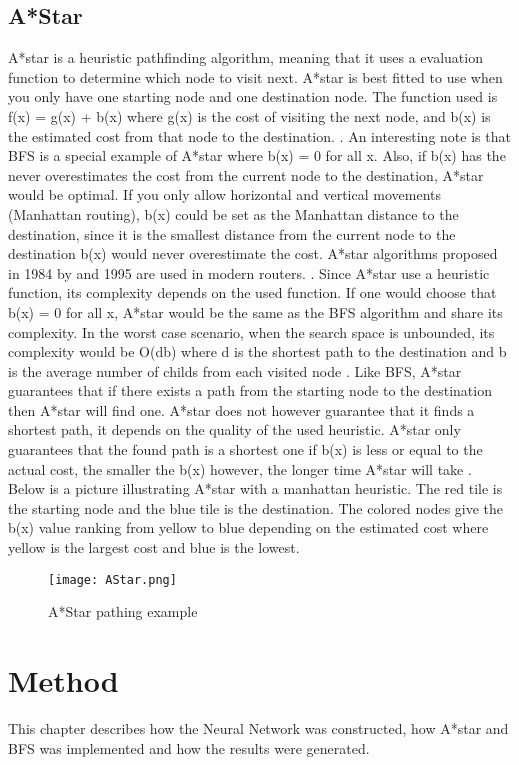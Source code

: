 \documentclass{kththesis}
\begin{document}
\section{A*Star}
A*star is a heuristic pathfinding algorithm, meaning that it uses a evaluation function to determine which node to visit next. A*star is best fitted to use when you only have one starting node and one destination node. The function used is f(x) = g(x) + b(x) where g(x) is the cost of visiting the next node, and b(x) is the estimated cost from that node to the destination. \parencite{redbloggames}. An interesting note is that BFS is a special example of A*star where b(x) = 0 for all x. Also, if b(x) has the never overestimates the cost from the current node to the destination, A*star would be optimal. If you only allow horizontal and vertical movements (Manhattan routing), b(x) could be set as the Manhattan distance to the destination, since it is the smallest distance from the current node to the destination b(x) would never overestimate the cost. A*star algorithms proposed in 1984 by and 1995 are used in modern routers. \parencite{EDA_routing}.
Since A*star use a heuristic function, its complexity depends on the used function. If one would choose that b(x) = 0 for all x, A*star would be the same as the BFS algorithm and share its complexity. In the worst case scenario, when the search space is unbounded, its complexity would be O(db) where d is the shortest path to the destination and b is the average number of childs from each visited node \parencite{russell}. Like BFS, A*star guarantees that if there exists a path from the starting node to the destination then A*star will find one. A*star does not however guarantee that it finds a shortest path, it depends on the quality of the used heuristic. A*star only guarantees that the found path is a shortest one if b(x) is less or equal to the actual cost, the smaller the b(x) however, the longer time A*star will take \parencite{stanford2}. Below is a picture illustrating A*star with a manhattan heuristic. The red tile is the starting node and the blue tile is the destination. The colored nodes give the b(x) value ranking from yellow to blue depending on the estimated cost where yellow is the largest cost and blue is the lowest.
 
\begin{figure}[h]
\texttt{[image: AStar.png]}
\caption{A*Star pathing example}
\end{figure}
 
 
 
\chapter{Method}
This chapter describes how the Neural Network was constructed, how A*star and BFS was implemented and how the results were generated.\\
 
\end{document}
